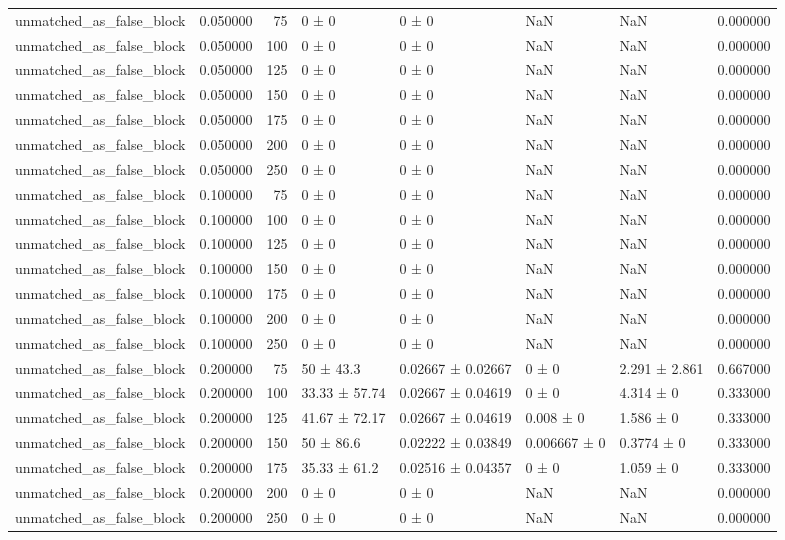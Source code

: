 \begin{tabular}{lrrllllr}
unmatched_as_false_block & 0.050000 & 75 & 0 ± 0 & 0 ± 0 & NaN & NaN & 0.000000 \\
unmatched_as_false_block & 0.050000 & 100 & 0 ± 0 & 0 ± 0 & NaN & NaN & 0.000000 \\
unmatched_as_false_block & 0.050000 & 125 & 0 ± 0 & 0 ± 0 & NaN & NaN & 0.000000 \\
unmatched_as_false_block & 0.050000 & 150 & 0 ± 0 & 0 ± 0 & NaN & NaN & 0.000000 \\
unmatched_as_false_block & 0.050000 & 175 & 0 ± 0 & 0 ± 0 & NaN & NaN & 0.000000 \\
unmatched_as_false_block & 0.050000 & 200 & 0 ± 0 & 0 ± 0 & NaN & NaN & 0.000000 \\
unmatched_as_false_block & 0.050000 & 250 & 0 ± 0 & 0 ± 0 & NaN & NaN & 0.000000 \\
unmatched_as_false_block & 0.100000 & 75 & 0 ± 0 & 0 ± 0 & NaN & NaN & 0.000000 \\
unmatched_as_false_block & 0.100000 & 100 & 0 ± 0 & 0 ± 0 & NaN & NaN & 0.000000 \\
unmatched_as_false_block & 0.100000 & 125 & 0 ± 0 & 0 ± 0 & NaN & NaN & 0.000000 \\
unmatched_as_false_block & 0.100000 & 150 & 0 ± 0 & 0 ± 0 & NaN & NaN & 0.000000 \\
unmatched_as_false_block & 0.100000 & 175 & 0 ± 0 & 0 ± 0 & NaN & NaN & 0.000000 \\
unmatched_as_false_block & 0.100000 & 200 & 0 ± 0 & 0 ± 0 & NaN & NaN & 0.000000 \\
unmatched_as_false_block & 0.100000 & 250 & 0 ± 0 & 0 ± 0 & NaN & NaN & 0.000000 \\
unmatched_as_false_block & 0.200000 & 75 & 50 ± 43.3 & 0.02667 ± 0.02667 & 0 ± 0 & 2.291 ± 2.861 & 0.667000 \\
unmatched_as_false_block & 0.200000 & 100 & 33.33 ± 57.74 & 0.02667 ± 0.04619 & 0 ± 0 & 4.314 ± 0 & 0.333000 \\
unmatched_as_false_block & 0.200000 & 125 & 41.67 ± 72.17 & 0.02667 ± 0.04619 & 0.008 ± 0 & 1.586 ± 0 & 0.333000 \\
unmatched_as_false_block & 0.200000 & 150 & 50 ± 86.6 & 0.02222 ± 0.03849 & 0.006667 ± 0 & 0.3774 ± 0 & 0.333000 \\
unmatched_as_false_block & 0.200000 & 175 & 35.33 ± 61.2 & 0.02516 ± 0.04357 & 0 ± 0 & 1.059 ± 0 & 0.333000 \\
unmatched_as_false_block & 0.200000 & 200 & 0 ± 0 & 0 ± 0 & NaN & NaN & 0.000000 \\
unmatched_as_false_block & 0.200000 & 250 & 0 ± 0 & 0 ± 0 & NaN & NaN & 0.000000 \\
\bottomrule
\end{tabular}
